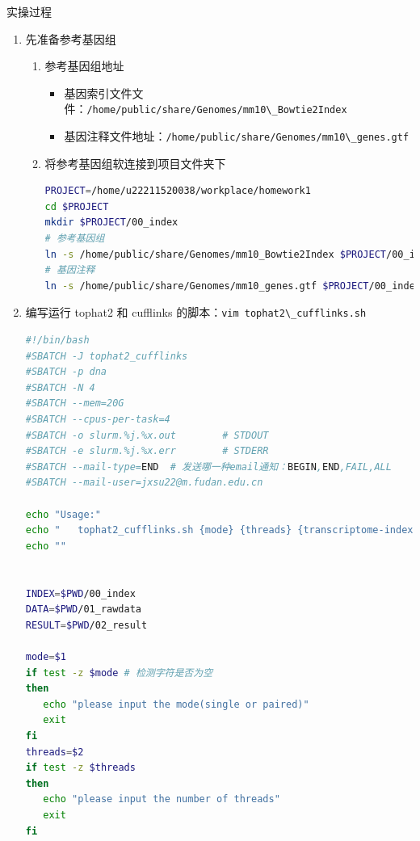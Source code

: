 \documentclass[
  a4paper,
]{article}
\newcommand{\passthrough}[1]{#1}
\providecommand{\tightlist}{%
  \setlength{\itemsep}{0pt}\setlength{\parskip}{0pt}}\usepackage{longtable,booktabs,array}
\begin{document}
实操过程

\begin{enumerate}
\def\labelenumi{\arabic{enumi}.}
\item
  先准备参考基因组

  \begin{enumerate}
  \def\labelenumii{\arabic{enumii}.}
  \item
    参考基因组地址

    \begin{itemize}
    \tightlist
    \item
      基因索引文件文件：\passthrough{\lstinline!/home/public/share/Genomes/mm10\_Bowtie2Index!}\hspace{0pt}
    \item
      基因注释文件地址：\passthrough{\lstinline!/home/public/share/Genomes/mm10\_genes.gtf!}\hspace{0pt}
    \end{itemize}
  \item
    将参考基因组软连接到项目文件夹下

\begin{lstlisting}[language=bash]
PROJECT=/home/u22211520038/workplace/homework1
cd $PROJECT
mkdir $PROJECT/00_index
# 参考基因组
ln -s /home/public/share/Genomes/mm10_Bowtie2Index $PROJECT/00_index
# 基因注释
ln -s /home/public/share/Genomes/mm10_genes.gtf $PROJECT/00_index
\end{lstlisting}
  \end{enumerate}
\item
  编写运行 tophat2 和 cufflinks
  的脚本：\passthrough{\lstinline!vim tophat2\_cufflinks.sh!}

\begin{lstlisting}[language=bash]
#!/bin/bash
#SBATCH -J tophat2_cufflinks
#SBATCH -p dna
#SBATCH -N 4
#SBATCH --mem=20G
#SBATCH --cpus-per-task=4
#SBATCH -o slurm.%j.%x.out        # STDOUT
#SBATCH -e slurm.%j.%x.err        # STDERR
#SBATCH --mail-type=END  # 发送哪一种email通知：BEGIN,END,FAIL,ALL
#SBATCH --mail-user=jxsu22@m.fudan.edu.cn

echo "Usage:"
echo "   tophat2_cufflinks.sh {mode} {threads} {transcriptome-index} {bowtie2-index} {SRR} {fq1} [{fq2}] "
echo ""


INDEX=$PWD/00_index
DATA=$PWD/01_rawdata
RESULT=$PWD/02_result

mode=$1
if test -z $mode # 检测字符是否为空
then
   echo "please input the mode(single or paired)"
   exit
fi
threads=$2
if test -z $threads
then
   echo "please input the number of threads"
   exit
fi


\end{lstlisting}
\end{enumerate}
\end{document}
